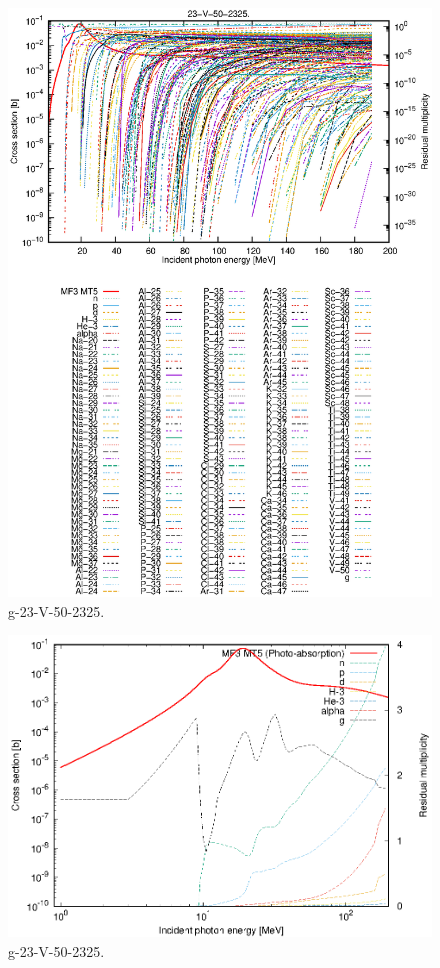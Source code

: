 \begin{figure}
 \includegraphics[width=\linewidth]{eps/g_23-V-50_2325.eps}
  \caption{g-23-V-50-2325.}
\end{figure}
\newpage \clearpage

\begin{figure}
 \includegraphics[width=\linewidth]{eps-log/g_23-V-50_2325.eps}
 \caption{g-23-V-50-2325.}
\end{figure}
\newpage \clearpage

